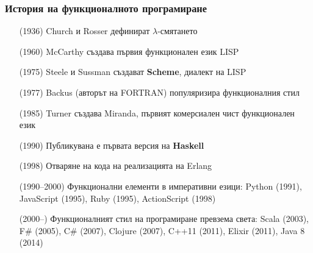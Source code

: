 \documentclass[alsotrans]{beamerswitch}
\begin{document}
\begin{frame}
  \frametitle{История на функционалното програмиране}

  \setlength{\leftmargini}{11ex}
  \begin{itemize}[<+->]
  \item[(1936)] Church и Rosser дефинират $\lambda$-смятането
  \item[(1960)] McCarthy създава първия функционален език LISP
  \item[(1975)] Steele и Sussman създават \textbf{Scheme}, диалект на LISP
  \item[(1977)] Backus (авторът на FORTRAN) популяризира функционалния стил
  \item[(1985)] Turner създава Miranda, първият комерсиален чист функционален език
  \item[(1990)] Публикувана е първата версия на \textbf{Haskell}
  \item[(1998)] Отваряне на кода на реализацията на Erlang
  \item[(1990--2000)] Функционални елементи в императивни езици: Python (1991), JavaScript (1995), Ruby (1995), ActionScript (1998)
  \item[(2000--)] Функционалният стил на програмиране превзема света: Scala (2003), F\# (2005), C\# (2007), Clojure (2007), C++11 (2011), Elixir (2011), Java 8 (2014)
  \end{itemize}
\end{frame}
\end{document}
